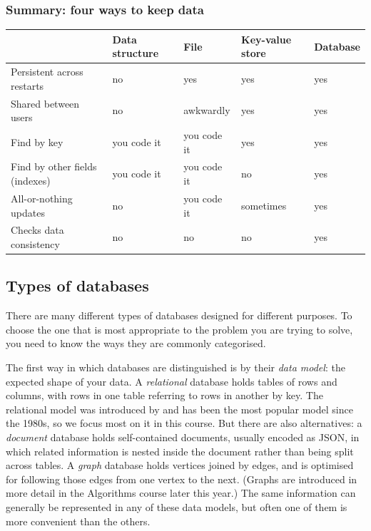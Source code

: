 \begin{frame}
    \label{s:comparison}
    \frametitle{Summary: four ways to keep data}
    \footnotesize
    \renewcommand{\arraystretch}{1.6}
    \setlength{\tabcolsep}{3pt}
    \begin{tabular}{>{\raggedright}p{2.35cm}|>{\raggedright}p{1.7cm}|>{\raggedright}p{1.7cm}|>{\raggedright}p{1.7cm}|>{\raggedright\arraybackslash}p{1.7cm}}
        \hline
        & \textbf{Data structure} & \textbf{File} & \textbf{Key-value store} & \textbf{Database} \\\hline
        Persistent across restarts & no & yes & yes & yes \pause\\
        Shared between users & no & awkwardly & yes & yes \pause\\
        Find by key & you code it & you code it & yes & yes \pause\\
        Find by other fields (indexes) & you code it & you code it & no & yes \pause\\
        All-or-nothing updates & no & you code it & sometimes & yes \pause\\
        Checks data consistency & no & no & no & yes \\\hline
    \end{tabular}
\end{frame}
\label{l:comparison}

\subsection{Types of databases}\label{sec:database-types}

There are many different types of databases designed for different purposes.
To choose the one that is most appropriate to the problem you are trying to solve, you need to know the ways they are commonly categorised.

The first way in which databases are distinguished is by their \emph{data model}: the expected shape of your data.
A \emph{relational} database holds tables of rows and columns, with rows in one table referring to rows in another by key.
The relational model was introduced by \citet{Codd1970} and has been the most popular model since the 1980s, so we focus most on it in this course.
But there are also alternatives: a \emph{document} database holds self-contained documents, usually encoded as JSON, in which related information is nested inside the document rather than being split across tables.
A \emph{graph} database holds vertices joined by edges, and is optimised for following those edges from one vertex to the next.
(Graphs are introduced in more detail in the Algorithms course later this year.)
The same information can generally be represented in any of these data models, but often one of them is more convenient than the others.

